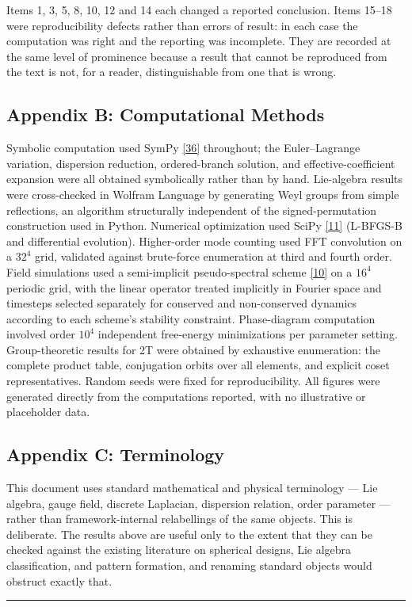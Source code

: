 \documentclass[a4paper,11pt]{article}
\begin{document}
Items 1, 3, 5, 8, 10, 12 and 14 each changed a reported conclusion. Items 15–18 were reproducibility defects rather than errors of result: in each case the computation was right and the reporting was incomplete. They are recorded at the same level of prominence because a result that cannot be reproduced from the text is not, for a reader, distinguishable from one that is wrong.

\subsection*{Appendix B: Computational Methods}

Symbolic computation used SymPy \hyperref[ref36]{[36]} throughout; the Euler–Lagrange variation, dispersion reduction, ordered-branch solution, and effective-coefficient expansion were all obtained symbolically rather than by hand. Lie-algebra results were cross-checked in Wolfram Language by generating Weyl groups from simple reflections, an algorithm structurally independent of the signed-permutation construction used in Python. Numerical optimization used SciPy \hyperref[ref11]{[11]} (L-BFGS-B and differential evolution). Higher-order mode counting used FFT convolution on a $32^4$ grid, validated against brute-force enumeration at third and fourth order. Field simulations used a semi-implicit pseudo-spectral scheme \hyperref[ref10]{[10]} on a $16^4$ periodic grid, with the linear operator treated implicitly in Fourier space and timesteps selected separately for conserved and non-conserved dynamics according to each scheme's stability constraint. Phase-diagram computation involved order $10^4$ independent free-energy minimizations per parameter setting. Group-theoretic results for 2T were obtained by exhaustive enumeration: the complete product table, conjugation orbits over all elements, and explicit coset representatives. Random seeds were fixed for reproducibility. All figures were generated directly from the computations reported, with no illustrative or placeholder data.

\subsection*{Appendix C: Terminology}

This document uses standard mathematical and physical terminology — Lie algebra, gauge field, discrete Laplacian, dispersion relation, order parameter — rather than framework-internal relabellings of the same objects. This is deliberate. The results above are useful only to the extent that they can be checked against the existing literature on spherical designs, Lie algebra classification, and pattern formation, and renaming standard objects would obstruct exactly that.
\medskip\hrule\medskip
\end{document}
